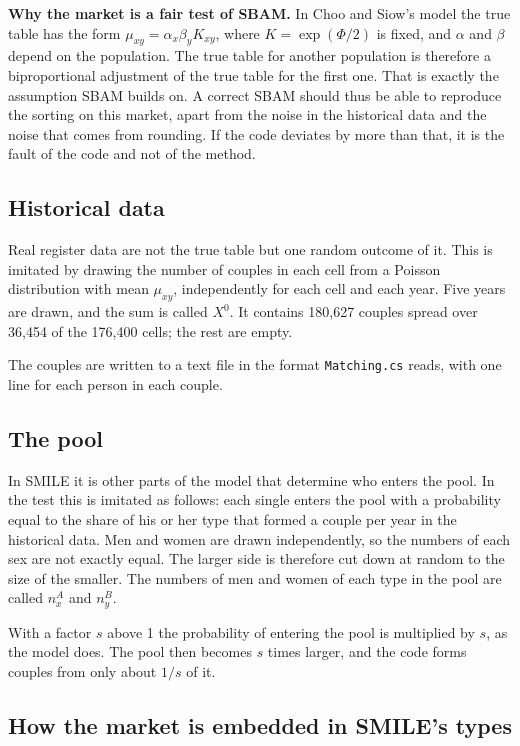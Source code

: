 \documentclass[12pt,a4paper]{article}
\newcommand{\kode}[1]{\texttt{#1}}
\begin{document}
\textbf{Why the market is a fair test of SBAM.} In Choo and Siow's model the true table has the form
$\mu_{xy}=\alpha_x\beta_yK_{xy}$, where $K=\exp(\Phi/2)$ is fixed, and $\alpha$ and $\beta$ depend
on the population. The true table for another population is therefore a biproportional adjustment
of the true table for the first one. That is exactly the assumption SBAM builds on. A correct SBAM
should thus be able to reproduce the sorting on this market, apart from the noise in the historical
data and the noise that comes from rounding. If the code deviates by more than that, it is the
fault of the code and not of the method.

\subsection{Historical data}

Real register data are not the true table but one random outcome of it. This is imitated by drawing
the number of couples in each cell from a Poisson distribution with mean $\mu_{xy}$, independently
for each cell and each year. Five years are drawn, and the sum is called $X^0$. It contains 180,627
couples spread over 36,454 of the 176,400 cells; the rest are empty.

The couples are written to a text file in the format \kode{Matching.cs} reads, with one line for
each person in each couple.

\subsection{The pool}

In SMILE it is other parts of the model that determine who enters the pool. In the test this is
imitated as follows: each single enters the pool with a probability equal to the share of his or
her type that formed a couple per year in the historical data. Men and women are drawn
independently, so the numbers of each sex are not exactly equal. The larger side is therefore cut
down at random to the size of the smaller. The numbers of men and women of each type in the pool
are called $n^A_x$ and $n^B_y$.

With a factor $s$ above 1 the probability of entering the pool is multiplied by $s$, as the model
does. The pool then becomes $s$ times larger, and the code forms couples from only about $1/s$ of
it.

\subsection{How the market is embedded in SMILE's types}\label{sec:indlejring}
\end{document}
